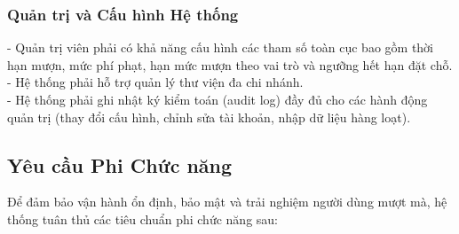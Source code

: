 \subsubsection{Quản trị và Cấu hình Hệ thống}
- Quản trị viên phải có khả năng cấu hình các tham số toàn cục bao gồm thời hạn mượn, mức phí phạt, hạn mức mượn theo vai trò và ngưỡng hết hạn đặt chỗ.\\
- Hệ thống phải hỗ trợ quản lý thư viện đa chi nhánh.\\
- Hệ thống phải ghi nhật ký kiểm toán (audit log) đầy đủ cho các hành động quản trị (thay đổi cấu hình, chỉnh sửa tài khoản, nhập dữ liệu hàng loạt).\\

\subsection{Yêu cầu Phi Chức năng}

Để đảm bảo vận hành ổn định, bảo mật và trải nghiệm người dùng mượt mà, hệ thống tuân thủ các tiêu chuẩn phi chức năng sau:

